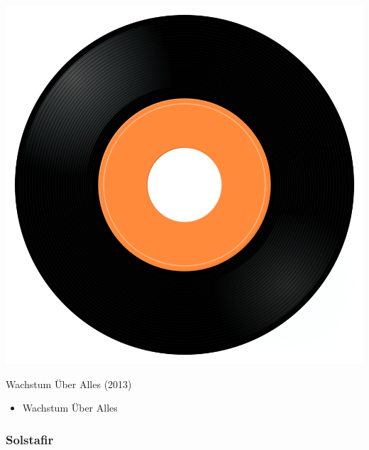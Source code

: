 \begin{minipage}[t]{0.25\textwidth}\vspace{0pt}
\captionsetup{type=figure}
\includegraphics[width=\textwidth]{Images/cover.png}
\caption*{Wachstum Über Alles (2013)}
\end{minipage}
\begin{minipage}[t]{0.25\textwidth}\vspace{0pt}
\begin{itemize}[nosep,leftmargin=1em,labelwidth=*,align=left]
	\setlength{\itemsep}{0pt}
	\item Wachstum Über Alles
\end{itemize}
\end{minipage}

\subsubsection{Solstafir}


